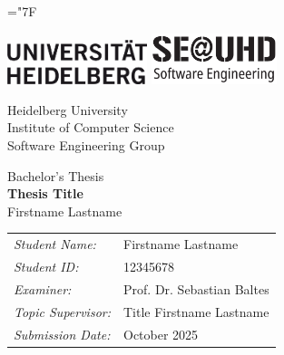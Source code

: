 \documentclass[
    pdftex,
    final,
    11pt,
    a4paper,
    parskip=false, %
    twoside, %
    footheight=0mm, %
    footinclude=false,
    toc=bibliography, %
    toc=listof %
]{scrbook} %
\newcommand{\thesistype}{Bachelor's Thesis} %
\newcommand{\thesistitle}{Thesis Title}
\newcommand{\studentname}{Firstname Lastname}
\newcommand{\submissiondate}{\nth{1} October 2025}
\newcommand{\studentid}{12345678}
\newcommand{\examiner}{Prof. Dr. Sebastian Baltes}
\newcommand{\supervisor}{Title Firstname Lastname} %
\begin{document}
\hyphenchar\font=\string"7F %

\frontmatter %

\begin{titlepage}

	\begin{center}
		\includegraphics[height=1.3cm,valign=t]{figures/logos/logo-uhd.png}	
		\hfill
		\includegraphics[height=1.5cm,valign=t]{figures/logos/se-uhd-logo.png}	
	\end{center}
	
	\vspace{2cm}

    \begin{center}
        \large
        Heidelberg University\\
        Institute of Computer Science\\
        Software Engineering Group
    \end{center}

    \vspace{3cm}
    
	\begin{center}
		{\large \thesistype}\\
		\vspace{1.5\baselineskip}
		{\LARGE\textsf{\textbf{\thesistitle}}}\\
        \vspace{1.5\baselineskip}
        {\large \studentname}
	\end{center}

	\vfill

    \begin{center}
        \large
        \begin{tabular}{@{}ll@{}}
        \emph{Student Name:} & \studentname \\
        \emph{Student ID:} & \studentid \\
        \emph{Examiner:} & \examiner \\
        \emph{Topic Supervisor:} & \supervisor \\
        \emph{Submission Date:} & \submissiondate
        \end{tabular}
    \end{center}

    \vspace{2cm}

\end{titlepage}
\end{document}
